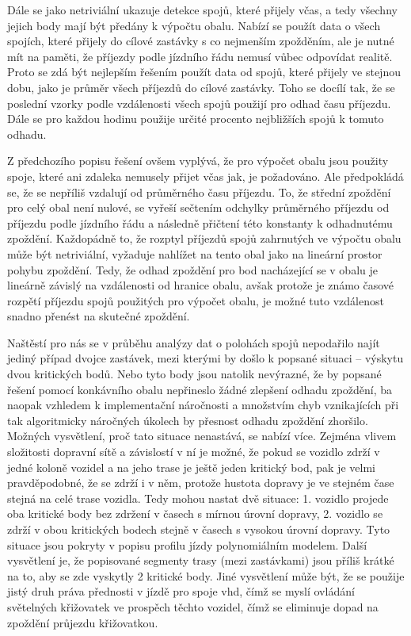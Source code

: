  \bigbreak


Dále se jako netriviální ukazuje detekce spojů, které přijely včas, a tedy všechny jejich body mají být předány k výpočtu obalu. Nabízí se použít data o všech spojích, které přijely do cílové zastávky s co nejmenším zpožděním, ale je nutné mít na paměti, že příjezdy podle jízdního řádu nemusí vůbec odpovídat realitě. Proto se zdá být nejlepším řešením použít data od spojů, které přijely ve stejnou dobu, jako je průměr všech příjezdů do cílové zastávky. Toho se docílí tak, že se poslední vzorky podle vzdálenosti všech spojů použijí pro odhad času příjezdu. Dále se pro každou hodinu použije určité procento nejbližších spojů k tomuto odhadu.


\bigbreak


Z předchozího popisu řešení ovšem vyplývá, že pro výpočet obalu jsou použity spoje, které ani zdaleka nemusely přijet včas jak, je požadováno. Ale předpokládá se, že se nepříliš vzdalují od průměrného času příjezdu. To, že střední zpoždění pro celý obal není nulové, se vyřeší sečtením odchylky průměrného příjezdu od příjezdu podle jízdního řádu a následně přičtení této konstanty k odhadnutému zpoždění. Každopádně to, že rozptyl příjezdů spojů zahrnutých ve výpočtu obalu může být netriviální, vyžaduje nahlížet na tento obal jako na lineární prostor pohybu zpoždění. Tedy, že odhad zpoždění pro bod nacházející se v obalu je lineárně závislý na vzdálenosti od hranice obalu, avšak protože je známo časové rozpětí příjezdu spojů použitých pro výpočet obalu, je možné tuto vzdálenost snadno přenést na skutečné zpoždění.


\bigbreak


Naštěstí pro nás se v průběhu analýzy dat o polohách spojů nepodařilo najít jediný případ dvojce zastávek, mezi kterými by došlo k popsané situaci -- výskytu dvou kritických bodů. Nebo tyto body jsou natolik nevýrazné, že by popsané řešení pomocí konkávního obalu nepřineslo žádné zlepšení odhadu zpoždění, ba naopak vzhledem k implementační náročnosti a množstvím chyb vznikajících při tak algoritmicky náročných úkolech by přesnost odhadu zpoždění zhoršilo. Možných vysvětlení, proč tato situace nenastává, se nabízí více. Zejména vlivem složitosti dopravní sítě a závislostí v ní je možné, že pokud se vozidlo zdrží v jedné koloně vozidel a na jeho trase je ještě jeden kritický bod, pak je velmi pravděpodobné, že se zdrží i v něm, protože hustota dopravy je ve stejném čase stejná na celé trase vozidla. Tedy mohou nastat dvě situace: 1. vozidlo projede oba kritické body bez zdržení v časech s mírnou úrovní dopravy, 2. vozidlo se zdrží v obou kritických bodech stejně v časech s vysokou úrovní dopravy. Tyto situace jsou pokryty v popisu profilu jízdy polynomiálním modelem. Další vysvětlení je, že popisované segmenty trasy (mezi zastávkami) jsou příliš krátké na to, aby se zde vyskytly 2 kritické body. Jiné vysvětlení může být, že se použije jistý druh práva přednosti v jízdě pro spoje \gls{vhd}, čímž se myslí ovládání světelných křižovatek ve prospěch těchto vozidel, čímž se eliminuje dopad na zpoždění průjezdu křižovatkou.



